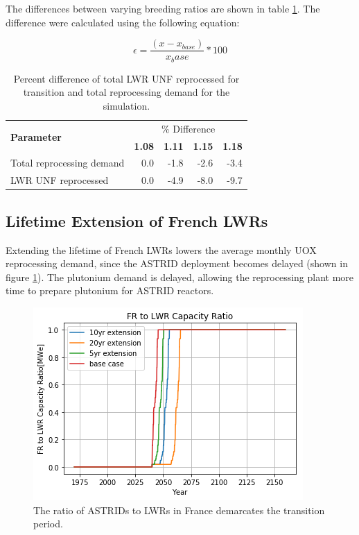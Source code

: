 The differences between varying breeding ratios are
shown in table \ref{tab:br_diff}. The difference were calculated
using the following equation:

\[ \epsilon = \frac{(x - x_{base})}{x_base} * 100 \]

\begin{table}[h]
	\centering
	\caption{Percent difference of total \gls{LWR} \gls{UNF} reprocessed
		for transition and total reprocessing demand for the simulation.}
	\begin{tabular}{lrrrr}
		\hline
		\multirow{2}{*}{\textbf{Parameter}} & \multicolumn{4}{c}{\% Difference} \\
		 & \textbf{1.08}& \textbf{1.11} & \textbf{1.15} & \textbf{1.18} \\
		\hline
		Total reprocessing demand & 0.0 & -1.8 & -2.6 & -3.4 \\ 
		\gls{LWR} \gls{UNF} reprocessed & 0.0  & -4.9 & -8.0 & -9.7 \\
		\hline
	\end{tabular}
	\label{tab:br_diff}
\end{table}


\subsection{Lifetime Extension of French \glspl{LWR}}\label{sec:life}
Extending the lifetime of French \glspl{LWR} lowers the average
monthly \gls{UOX} reprocessing demand, since the \gls{ASTRID} deployment becomes 
delayed (shown in figure \ref{fig:pow_diff}). The plutonium demand is delayed,
 allowing the reprocessing plant more time to prepare plutonium for \gls{ASTRID} reactors.

\begin{figure}[htbp!]
    \begin{center}
        \includegraphics[scale=0.7]{./images/sensitivity/pow_ratio.png}
    \end{center}
    \caption{The ratio of \glspl{ASTRID} to \glspl{LWR} in France demarcates 
    the transition period.}
    \label{fig:pow_diff}
\end{figure}

